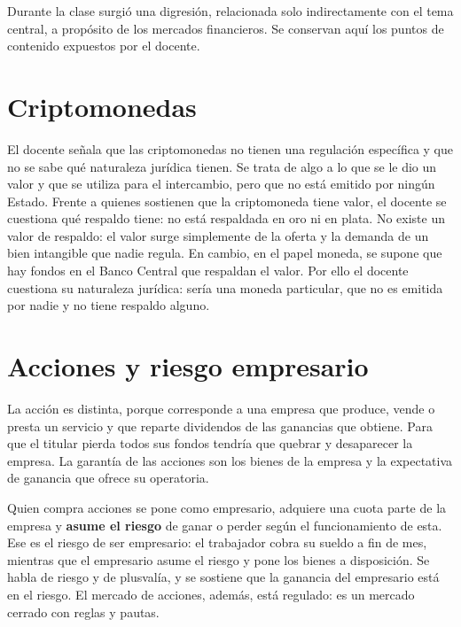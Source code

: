 \documentclass[12pt,oneside]{book}
\begin{document}
Durante la clase surgió una digresión, relacionada solo indirectamente con el tema central, a propósito de los mercados financieros. Se conservan aquí los puntos de contenido expuestos por el docente.


\section{Criptomonedas}

El docente señala que las criptomonedas no tienen una regulación específica y que no se sabe qué naturaleza jurídica tienen. Se trata de algo a lo que se le dio un valor y que se utiliza para el intercambio, pero que no está emitido por ningún Estado. Frente a quienes sostienen que la criptomoneda tiene valor, el docente se cuestiona qué respaldo tiene: no está respaldada en oro ni en plata. No existe un valor de respaldo: el valor surge simplemente de la oferta y la demanda de un bien intangible que nadie regula. En cambio, en el papel moneda, se supone que hay fondos en el Banco Central que respaldan el valor. Por ello el docente cuestiona su naturaleza jurídica: sería una moneda particular, que no es emitida por nadie y no tiene respaldo alguno.

\section{Acciones y riesgo empresario}

La acción es distinta, porque corresponde a una empresa que produce, vende o presta un servicio y que reparte dividendos de las ganancias que obtiene. Para que el titular pierda todos sus fondos tendría que quebrar y desaparecer la empresa. La garantía de las acciones son los bienes de la empresa y la expectativa de ganancia que ofrece su operatoria.

Quien compra acciones se pone como empresario, adquiere una cuota parte de la empresa y \textbf{asume el riesgo} de ganar o perder según el funcionamiento de esta. Ese es el riesgo de ser empresario: el trabajador cobra su sueldo a fin de mes, mientras que el empresario asume el riesgo y pone los bienes a disposición. Se habla de riesgo y de plusvalía, y se sostiene que la ganancia del empresario está en el riesgo. El mercado de acciones, además, está regulado: es un mercado cerrado con reglas y pautas.
\end{document}
